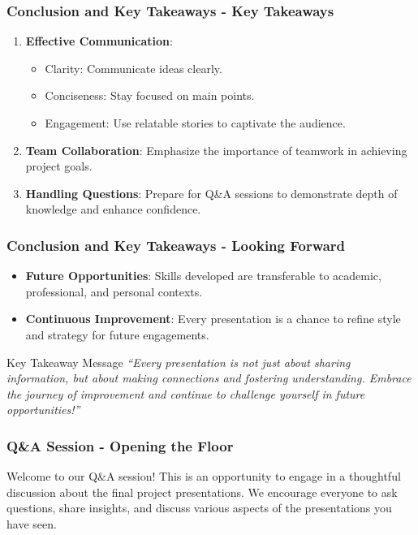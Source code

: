 \documentclass[aspectratio=169]{beamer}
\begin{document}
\begin{frame}[fragile]
    \frametitle{Conclusion and Key Takeaways - Key Takeaways}
    \begin{enumerate}
        \item \textbf{Effective Communication}:
            \begin{itemize}
                \item Clarity: Communicate ideas clearly.
                \item Conciseness: Stay focused on main points.
                \item Engagement: Use relatable stories to captivate the audience.
            \end{itemize}
        \item \textbf{Team Collaboration}: Emphasize the importance of teamwork in achieving project goals.
        \item \textbf{Handling Questions}: Prepare for Q&A sessions to demonstrate depth of knowledge and enhance confidence.
    \end{enumerate}
\end{frame}

\begin{frame}[fragile]
    \frametitle{Conclusion and Key Takeaways - Looking Forward}
    \begin{itemize}
        \item \textbf{Future Opportunities}: Skills developed are transferable to academic, professional, and personal contexts.
        \item \textbf{Continuous Improvement}: Every presentation is a chance to refine style and strategy for future engagements.
    \end{itemize}
    \begin{block}{Key Takeaway Message}
        \textit{“Every presentation is not just about sharing information, but about making connections and fostering understanding. Embrace the journey of improvement and continue to challenge yourself in future opportunities!”}
    \end{block}
\end{frame}

\begin{frame}[fragile]
  \frametitle{Q\&A Session - Opening the Floor}
  Welcome to our Q\&A session! This is an opportunity to engage in a thoughtful discussion about the final project presentations. We encourage everyone to ask questions, share insights, and discuss various aspects of the presentations you have seen.
\end{frame}
\end{document}
